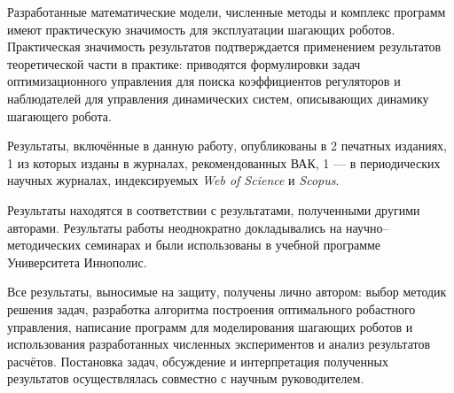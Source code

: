 Разработанные математические модели, численные методы и комплекс программ имеют практическую значимость для эксплуатации шагающих роботов. Практическая значимость результатов подтверждается применением результатов теоретической части в практике: приводятся формулировки задач оптимизационного управления для поиска коэффициентов регуляторов и наблюдателей для управления динамических систем, описывающих динамику шагающего робота. 

{\reliability} 

Результаты, включённые в данную работу, опубликованы в 2 печатных изданиях, 1 из которых изданы в журналах, рекомендованных ВАК, 1 --- в периодических научных журналах, индексируемых \textit{Web of Science} и \textit{Scopus}. 

Результаты находятся в соответствии с результатами, полученными другими авторами. Результаты работы неоднократно докладывались на научно--методических семинарах и были использованы в учебной программе Университета Иннополис.

{\contribution} 

Все результаты, выносимые на защиту, получены лично автором: выбор методик решения задач, разработка алгоритма построения оптимального робастного управления, написание программ для моделирования шагающих роботов и использования разработанных численных экспериментов и анализ результатов расчётов. Постановка задач, обсуждение и интерпретация полученных результатов осуществлялась совместно с научным руководителем.